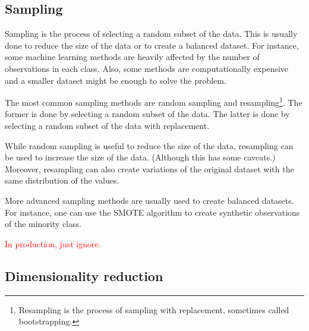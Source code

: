 
\subsection{Sampling}

Sampling is the process of selecting a random subset of the data.  This is usually done to
reduce the size of the data or to create a balanced dataset.  For instance, some machine
learning methods are heavily affected by the number of observations in each class.
Also, some methods are computationally expensive and a smaller dataset might be enough to
solve the problem.

The most common sampling methods are random sampling and resampling\footnote{Resampling is
the process of sampling with replacement, sometimes called bootstrapping.}.  The former is
done by selecting a random subset of the data.  The latter is done by selecting a random
subset of the data with replacement.

While random sampling is useful to reduce the size of the data, resampling can be used to
increase the size of the data.  (Although this has some caveats.)  Moreover, resampling
can also create variations of the original dataset with the same distribution of the
values.

More advanced sampling methods are usually used to create balanced datasets.  For
instance, one can use the SMOTE algorithm to create
synthetic observations of the minority class.

\textcolor{red}{In production, just ignore.}

\subsection{Dimensionality reduction}

